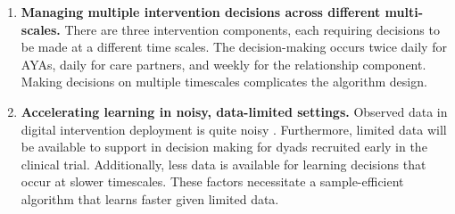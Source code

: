 


\begin{enumerate}

\item \textbf{Managing multiple intervention decisions across different multi-scales.} There are three intervention components, each requiring decisions to be made at a different time scales. 
The decision-making occurs twice daily for AYAs, daily for care partners, and weekly for the relationship component. Making decisions on multiple timescales complicates the  algorithm design.
\item \textbf{Accelerating learning in noisy, data-limited settings.} 
Observed data in  digital intervention deployment is quite noisy \cite{trella2022designing}. Furthermore, limited data will be available to support in decision making for dyads recruited early in the clinical trial.  %
Additionally, less data is available for learning  decisions that occur at slower timescales. These factors necessitate a sample-efficient algorithm that learns faster given limited data.

\end{enumerate}

